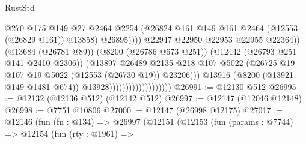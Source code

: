 \begin{lexlean}{RustStd}
\begin{coremodule}
                                                        @270
                                                        @175
                                                        @149
                                                        @27
                                                        @2464
                                                        @2254
                                                        (@26824
                                                          @161
                                                          @149
                                                          @161
                                                          @2464
                                                          (@12553 (@26829 @161))
                                                          @13858)
                                                        @26895))))
                                                @22947
                                                @22950
                                                @22953
                                                @22955
                                                @22364))
                                            (@13684 (@26781 @89))
                                            (@8200 (@26786 @673 @251))
                                            (@12442 (@26793 @251 @141 @2410 @2306))
                                            (@13897
                                              @26489
                                              @2135
                                              @218
                                              @107
                                              @5022
                                              (@26725
                                                @19
                                                @107
                                                @19
                                                @5022
                                                (@12553 (@26730 @19))
                                                @23206)))
                                          @13916
                                          (@8200 (@13921 @149 @1481 @674))
                                          @13928)))))))))))))))))))
@26991 := @12130 @512
@26995 := @12132 (@12136 @512) (@12142 @512)
@26997 := @12147 (@12046 @12148)
@26998 := @7751 @10806
@27000 := @12147 (@26998 @12175)
@27017 := @12146
    (fun (fn : @134) =>
    @26997
      (@12151
        (@12153
          (fun (params : @7744) =>
          @12154
            (fun (rty : @1961) =>

\end{coremodule}
\end{lexlean}
